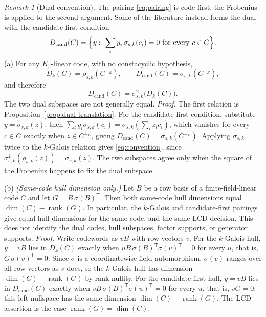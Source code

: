 \documentclass[10pt,a4paper]{article}
\newcommand{\rank}{\operatorname{rank}}
\newcommand{\perpE}{\perp_E}
\newcommand{\Dk}{D_k}
\numberwithin{equation}{section}
\theoremstyle{plain}
\theoremstyle{definition}
\theoremstyle{remark}
\newtheorem{remark}[theorem]{Remark}
\begin{document}
\begin{remark}[Dual convention]\label{rem:candidate}
The pairing \eqref{eq:pairing} is code-first: the Frobenius is applied to the
second argument. Some of the literature instead forms the dual with the
candidate-first condition
\[
D_{\mathrm{cand}}(C)=\Bigl\{y:\ \sum_i y_i\,\sigma_{s,k}(c_i)=0\text{ for every }c\in C\Bigr\}.
\]
\textup{(a)} For any $K_s$-linear code, with no constacyclic hypothesis,
\[
\Dk(C)=\rho_{s,k}(C^{\perpE}),\qquad
D_{\mathrm{cand}}(C)=\sigma_{s,k}(C^{\perpE}),
\]
and therefore
\begin{equation}\label{eq:convention}
D_{\mathrm{cand}}(C)=\sigma_{s,k}^{2}\bigl(\Dk(C)\bigr).
\end{equation}
The two dual subspaces are not generally equal.
\emph{Proof.} The first relation is Proposition~\ref{prop:dual-translation}.
For the candidate-first condition, substitute $y=\sigma_{s,k}(z)$: then
$\sum_iy_i\sigma_{s,k}(c_i)=\sigma_{s,k}(\sum_iz_ic_i)$, which vanishes for every
$c\in C$ exactly when $z\in C^{\perpE}$, giving
$D_{\mathrm{cand}}(C)=\sigma_{s,k}(C^{\perpE})$. Applying $\sigma_{s,k}$ twice to
the $k$-Galois relation gives \eqref{eq:convention}, since
$\sigma_{s,k}^{2}(\rho_{s,k}(z))=\sigma_{s,k}(z)$. The two subspaces agree only
when the square of the Frobenius happens to fix the dual subspace.

\textup{(b)} \emph{(Same-code hull dimension only.)} Let $B$ be a row basis of a
finite-field-linear code $C$ and let $G=B\,\sigma(B)^{\mathsf T}$. Then both
same-code hull dimensions equal $\dim(C)-\rank(G)$. In particular, the
$k$-Galois and candidate-first pairings give equal hull dimensions for the same
code, and the same LCD decision. This does not identify the dual codes, hull
subspaces, factor supports, or generator supports.
\emph{Proof.} Write codewords as $vB$ with row vectors $v$. For the $k$-Galois
hull, $y=vB$ lies in $\Dk(C)$ exactly when
$uB\,\sigma(B)^{\mathsf T}\sigma(v)^{\mathsf T}=0$ for every $u$, that is,
$G\,\sigma(v)^{\mathsf T}=0$. Since $\sigma$ is a coordinatewise field
automorphism, $\sigma(v)$ ranges over all row vectors as $v$ does, so the
$k$-Galois hull has dimension $\dim(C)-\rank(G)$ by rank-nullity. For the
candidate-first hull, $y=vB$ lies in $D_{\mathrm{cand}}(C)$ exactly when
$vB\,\sigma(B)^{\mathsf T}\sigma(u)^{\mathsf T}=0$ for every $u$, that is,
$vG=0$; this left nullspace has the same dimension $\dim(C)-\rank(G)$. The LCD
assertion is the case $\rank(G)=\dim(C)$.
\end{remark}
\end{document}

